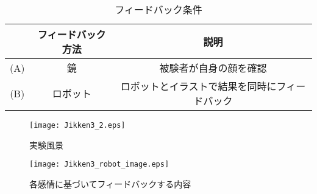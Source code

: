 \documentclass[titlepage]{jarticle}
\begin{document}
\begin{table}[h]
\centering
\caption{フィードバック条件}
\begin{tabular}{|c|c|c|}
    \hline
		&フィードバック方法 & 説明 \\
	\hline
	\hline
		(A) & 鏡 & 被験者が自身の顔を確認 \\
	\hline
		(B) & ロボット & ロボットとイラストで結果を同時にフィードバック \\
	\hline
\end{tabular}
\label{Environment List 2}
\end{table}

\begin{figure}[h]
\begin{center}
\texttt{[image: Jikken3\_2.eps]}
\end{center}
\caption{実験風景}
\label{Jikken3 2} 
\end{figure}

\afterpage{\clearpage}
\newpage

\begin{figure}[h]
\begin{center}
\texttt{[image: Jikken3\_robot\_image.eps]}
\end{center}
\caption{各感情に基づいてフィードバックする内容}
\label{Jikken3 Image} 
\end{figure}
\end{document}
